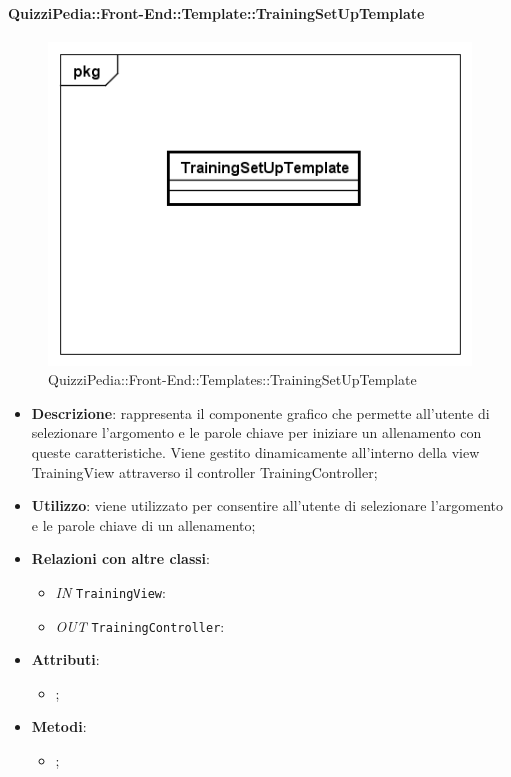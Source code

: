 		\paragraph{QuizziPedia::Front-End::Template::TrainingSetUpTemplate}
		
		\label{QuizziPedia::Front-End::Templates::TrainingSetUpTemplate}
		
		\begin{figure}[h]
			\centering
			\includegraphics[scale=0.5,keepaspectratio]{UML/Classi/Front-End/QuizziPedia_Front-end_Templates_TrainingSetUpTemplate.png}
			\caption{QuizziPedia::Front-End::Templates::TrainingSetUpTemplate}
		\end{figure}
		
		\begin{itemize}
			\item \textbf{Descrizione}: rappresenta il componente grafico che permette all'utente di selezionare l'argomento e le parole chiave per iniziare un allenamento con queste caratteristiche. Viene gestito dinamicamente all'interno della view TrainingView attraverso il controller TrainingController;
			\item \textbf{Utilizzo}: viene utilizzato per consentire all'utente di selezionare l'argomento e le parole chiave di un allenamento;
			\item \textbf{Relazioni con altre classi}: 
			\begin{itemize}
				\item \textit{IN} \texttt{TrainingView}: 
				\item \textit{OUT} \texttt{TrainingController}:
			\end{itemize}
			\item \textbf{Attributi}: 
			\begin{itemize}
				\item ;
			\end{itemize}
			\item \textbf{Metodi}: 
			\begin{itemize}
				\item ;
			\end{itemize}
		\end{itemize}
		
